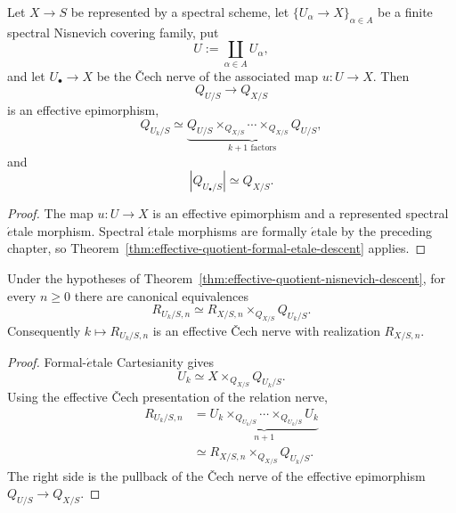 \begin{corollary}
\label{thm:effective-quotient-nisnevich-descent}
Let \(X\to S\) be represented by a spectral scheme, let
\(\{U_\alpha\to X\}_{\alpha\in A}\) be a finite spectral Nisnevich covering family, put
\[
    U:=\coprod_{\alpha\in A}U_\alpha,
\]
and let \(U_\bullet\to X\) be the \v{C}ech nerve of the associated map \(u:U\to X\).  Then
\[
\boxed{
    Q_{U/S}\longrightarrow Q_{X/S}
}
\]
is an effective epimorphism,
\[
\boxed{
    Q_{U_k/S}
    \simeq
    \underbrace{
        Q_{U/S}\times_{Q_{X/S}}\cdots\times_{Q_{X/S}}Q_{U/S}
    }_{k+1\text{ factors}},
}
\]
and
\[
    |Q_{U_\bullet/S}|\simeq Q_{X/S}.
\]
\end{corollary}

\begin{proof}
The map \(u:U\to X\) is an effective epimorphism and a represented spectral
\(\acute{e}\)tale morphism.  Spectral \(\acute{e}\)tale morphisms are formally
\(\acute{e}\)tale by the preceding chapter, so
Theorem~\ref{thm:effective-quotient-formal-etale-descent} applies.
\end{proof}

\begin{proposition}
\label{prop:modal-relation-degree-nisnevich-descent}
Under the hypotheses of Theorem~\ref{thm:effective-quotient-nisnevich-descent}, for every \(n\geq0\)
there are canonical equivalences
\[
\boxed{
    R_{U_k/S,n}
    \simeq
    R_{X/S,n}\times_{Q_{X/S}}Q_{U_k/S}.
}
\]
Consequently \(k\mapsto R_{U_k/S,n}\) is an effective \v{C}ech nerve with realization
\(R_{X/S,n}\).
\end{proposition}

\begin{proof}
Formal-\(\acute{e}\)tale Cartesianity gives
\[
    U_k\simeq X\times_{Q_{X/S}}Q_{U_k/S}.
\]
Using the effective \v{C}ech presentation of the relation nerve,
\[
\begin{aligned}
    R_{U_k/S,n}
    &=
    \underbrace{
        U_k\times_{Q_{U_k/S}}\cdots\times_{Q_{U_k/S}}U_k
    }_{n+1}
    \\
    &\simeq
    R_{X/S,n}\times_{Q_{X/S}}Q_{U_k/S}.
\end{aligned}
\]
The right side is the pullback of the \v{C}ech nerve of the effective epimorphism
\(Q_{U/S}\to Q_{X/S}\).
\end{proof}

